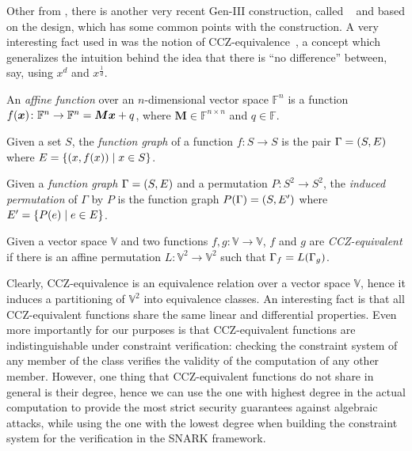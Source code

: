 Other from \Griffin, there is another very recent Gen-III construction, called 
\Anemoi~\cite{BouvierBCPSVW2022} and based on the \Flystel{} design, which has some common points 
with the \Horst{} construction.
A very interesting fact used in \Flystel{} was the notion of CCZ-equivalence~\cite{CarletCZ1998},
a concept which generalizes the intuition behind the idea that there is ``no difference'' 
between, say, using \(x^{d}\) and \(x^{\frac{1}{d}}\).
\begin{definition}
  An \emph{affine function} over an \(n\)-dimensional vector space \(\mathbb{F}^n\) is a function
  \(\call{f}{\bm{x}}\colon \mathbb{F}^n \to \mathbb{F}^n = \bm{Mx} + q\), where 
  \(\bm{M} \in \mathbb{F}^{n \times n}\) and \(q \in \mathbb{F}\).
\end{definition}
\begin{definition}
  Given a set \(S\), the \emph{function graph} of a function \(f\colon S \to S\) is the pair 
  \(\Gamma = \left(S, E\right)\) where \(E = \Set{\Tuple{x, \call{f}{x}} \mid x \in S}\).
\end{definition}
\begin{definition}
  Given a \emph{function graph} \(\Gamma = \left(S, E\right)\) and a permutation \(P\colon S^2 \to S^2\), 
  the \emph{induced permutation} of \(\Gamma \) by \(P\) is the function graph 
  \(\call{P}{\Gamma} = \Tuple{S, E'}\) where \(E' = \Set{\call{P}{e} \mid e \in E}\).
\end{definition}
\begin{definition}
  Given a vector space \(\mathbb{V}\) and two functions 
  \(f,g\colon \mathbb{V} \to \mathbb{V}\), \(f\) and \(g\) are \emph{CCZ-equivalent} if there 
  is an affine permutation \(L\colon \mathbb{V}^2 \to \mathbb{V}^2\) such 
  that \(\Gamma_{f} = \call{L}{\Gamma_{g}}\).
\end{definition}

Clearly, CCZ-equivalence is an equivalence relation over a vector space \(\mathbb{V}\), hence it 
induces a partitioning of \(\mathbb{V}^2\) into equivalence classes.
An interesting fact is that all CCZ-equivalent functions share the same linear and differential 
properties.
Even more importantly for our purposes is that CCZ-equivalent functions are indistinguishable under 
constraint verification: checking the constraint system of any member of the class verifies 
the validity of the computation of any other member.
However, one thing that CCZ-equivalent functions do not share in general is their degree, hence we 
can use the one with highest degree in the actual computation to provide the most strict security 
guarantees against algebraic attacks, while using the one with the lowest degree when building
the constraint system for the verification in the SNARK framework.

